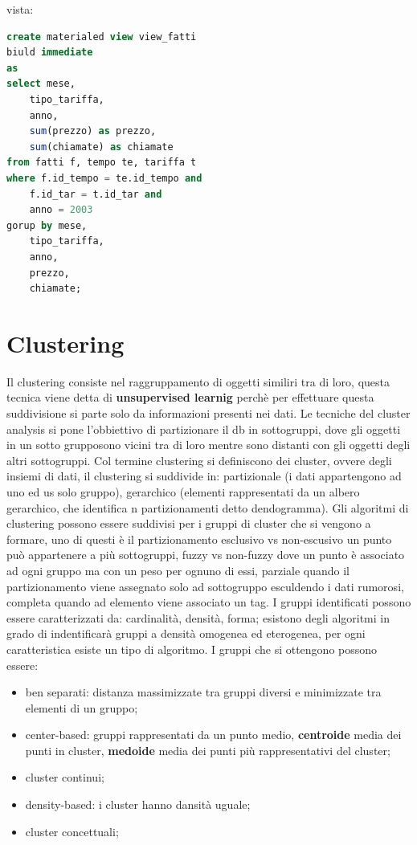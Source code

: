 \documentclass[12pt]{article}
\begin{document}
vista:
\begin{lstlisting}[language=sql]
create materialed view view_fatti
biuld immediate
as
select mese,
    tipo_tariffa,
    anno,
    sum(prezzo) as prezzo,
    sum(chiamate) as chiamate
from fatti f, tempo te, tariffa t
where f.id_tempo = te.id_tempo and
    f.id_tar = t.id_tar and
    anno = 2003
gorup by mese,
    tipo_tariffa,
    anno,
    prezzo,
    chiamate;
\end{lstlisting}



\newpage
\section{Clustering}
Il clustering consiste nel raggruppamento di oggetti similiri tra di loro, questa tecnica viene detta di \textbf{unsupervised learnig} perch\`e per effettuare questa suddivisione si parte solo da informazioni presenti nei dati. Le tecniche del cluster analysis si pone l'obbiettivo di partizionare il db in sottogruppi, dove gli oggetti in un sotto grupposono vicini tra di loro mentre sono distanti con gli oggetti degli altri sottogruppi. Col termine clustering si definiscono dei cluster, ovvere degli insiemi di dati, il clustering si suddivide in: partizionale (i dati appartengono ad uno ed us solo gruppo), gerarchico (elementi rappresentati da un albero gerarchico, che identifica n partizionamenti detto dendogramma). Gli algoritmi di clustering possono essere suddivisi per i gruppi di cluster che si vengono a formare, uno di questi \`e il partizionamento esclusivo vs non-escusivo un punto pu\`o appartenere a pi\`u sottogruppi, fuzzy vs non-fuzzy dove un punto \`e associato ad ogni gruppo ma con un peso per ognuno di essi, parziale quando il partizionamento viene assegnato solo ad sottogruppo esculdendo i dati rumorosi, completa quando ad elemento viene associato un tag. I gruppi identificati possono essere caratterizzati da: cardinalit\`a, densit\`a, forma; esistono degli algoritmi in grado di indentificar\`a gruppi a densit\`a omogenea ed eterogenea, per ogni caratteristica esiste un tipo di algoritmo. I gruppi che si ottengono possono essere:
\begin{itemize}
    \item ben separati: distanza massimizzate tra gruppi diversi e minimizzate tra elementi di un gruppo;
    \item center-based: gruppi rappresentati da un punto medio, \textbf{centroide} media dei punti in cluster, \textbf{medoide} media dei punti pi\`u rappresentativi del cluster;
    \item cluster continui;
    \item density-based: i cluster hanno dansit\`a uguale;
    \item cluster concettuali;
\end{itemize}
\end{document}
